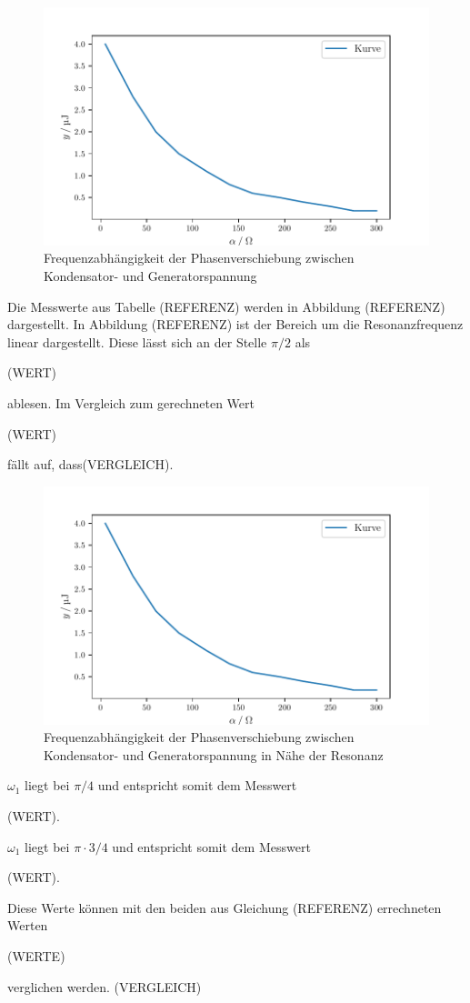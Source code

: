 \begin{figure}[H]
  \centering
  \includegraphics{build/plot4.pdf}
  \caption{Frequenzabhängigkeit der Phasenverschiebung zwischen Kondensator- und Generatorspannung}
  \label{fig:plot}
\end{figure}
\noindent Die Messwerte aus Tabelle (REFERENZ) werden in Abbildung
(REFERENZ) dargestellt. In Abbildung (REFERENZ) ist
der Bereich um die Resonanzfrequenz linear dargestellt.
Diese lässt sich an der Stelle $\pi/2$ als

(WERT)


\noindent ablesen. Im Vergleich zum gerechneten Wert

(WERT)

\noindent fällt auf, dass(VERGLEICH).
\begin{figure}[H]
  \centering
  \includegraphics{build/plot5.pdf}
  \caption{Frequenzabhängigkeit der Phasenverschiebung zwischen Kondensator- und Generatorspannung in Nähe der Resonanz}
  \label{fig:plot}
\end{figure}
\noindent $\omega_1$ liegt bei $\pi/4$ und entspricht
somit dem Messwert

(WERT).


\noindent $\omega_1$ liegt bei $\pi \cdot 3/4$ und entspricht
somit dem Messwert

(WERT).

Diese Werte können mit den beiden aus Gleichung (REFERENZ)
errechneten Werten 

(WERTE)

\noindent verglichen werden. (VERGLEICH)



